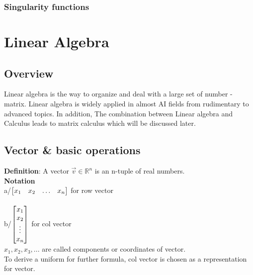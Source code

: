 \documentclass[12pt,a4paper]{article}
\begin{document}
\subsubsection{Singularity functions}

\section{Linear Algebra}
\subsection{Overview}
Linear algebra is the way to organize and deal with a large set of number - matrix. Linear algebra is widely applied in almost AI fields from rudimentary to advanced topics. In addition, The combination between Linear algebra and Calculus leads to matrix calculus which will be discussed later.\\

\subsection{Vector \& basic operations}
\textbf{Definition}: A vector $\vec{v}\in\mathbb{R}^{n}$ is an n-tuple of real numbers.\\

\noindent\textbf{Notation}\\
a/$\mqty[x_1& x_2& \hdots & x_n]$ for row vector\\\\
b/$\mqty[x_1\\ x_2\\ \vdots\\ x_n]$ for col vector\\
$x_1, x_2, x_3, ...$ are called components or coordinates of vector.\\
\noindent To derive a uniform for further formula, col vector is chosen as a representation for vector.\\
\end{document}
